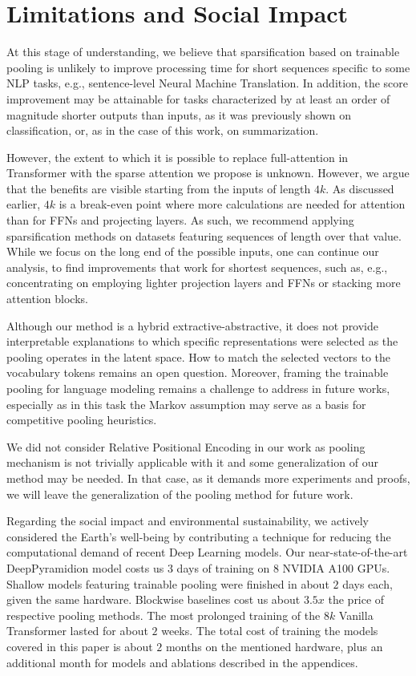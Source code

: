 \documentclass{article}
\begin{document}
\section{Limitations and Social Impact}\label{sec:limitions_and_social_impact}

At this stage of understanding, we believe that sparsification based on trainable pooling is unlikely to improve processing time for short sequences specific to some NLP tasks, e.g., sentence-level Neural Machine Translation. In addition, the score improvement may be attainable for tasks characterized by at least an order of magnitude shorter outputs than inputs, as it was previously shown on classification, or, as in the case of this work, on summarization.

However, the extent to which it is possible to replace full-attention in Transformer with the sparse attention we propose is unknown. However, we argue that the benefits are visible starting from the inputs of length $4k$. As discussed earlier, $4k$ is a break-even point where more calculations are needed for attention than for FFNs and projecting layers. As such, we recommend applying sparsification methods on datasets featuring sequences of length over that value.
While we focus on the long end of the possible inputs, one can continue our analysis, to find improvements that work for shortest sequences, such as, e.g., concentrating on employing lighter projection layers and FFNs or stacking more attention blocks.

Although our method is a hybrid extractive-abstractive, it does not provide interpretable explanations to which specific representations were selected as the pooling operates in the latent space. How to match the selected vectors to the vocabulary tokens remains an open question. 
Moreover, framing the trainable pooling for language modeling remains a challenge to address in future works, especially as in this task the Markov assumption may serve as a basis for competitive pooling heuristics.

We did not consider Relative Positional Encoding in our work as pooling mechanism
is not trivially applicable with it and some generalization of our method may be needed. In that case, as it demands more experiments and proofs, we will leave the generalization of the pooling method for future work.

Regarding the social impact and environmental sustainability, we actively considered the Earth's well-being by contributing a technique for reducing the computational demand of recent Deep Learning models.
Our near-state-of-the-art DeepPyramidion model costs us $3$ days of training on $8$ NVIDIA A100 GPUs. Shallow models featuring trainable pooling were finished in about $2$ days each, given the same hardware. Blockwise baselines cost us about $3.5x$ the price of respective pooling methods. The most prolonged training of the $8k$ Vanilla Transformer lasted for about $2$ weeks. The total cost of training the models covered in this paper is about $2$ months on the mentioned hardware, plus an additional month for models and ablations described in the appendices.
\end{document}

